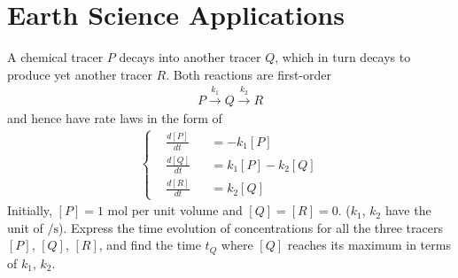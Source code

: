 \section{Earth Science Applications}

\begin{exmp}
A chemical tracer $P$ decays into another tracer $Q$, which in turn decays to produce yet another tracer $R$. Both reactions are first-order
\begin{align*}
P \xrightarrow{k_1} Q \xrightarrow{k_2} R
\end{align*}
and hence have rate laws in the form of
\begin{align*}
\left\{\begin{alignedat}{2}
&\frac{d[P]}{dt} & &= -k_1[P] \\
&\frac{d[Q]}{dt} & &= k_1[P] - k_2[Q] \\
&\frac{d[R]}{dt} & &= k_2[Q]
\end{alignedat}\right.
\end{align*}
Initially, $[P] = 1$ mol per unit volume and $[Q] = [R] = 0$. ($k_1$, $k_2$ have the unit of $\si{\per \s}$). Express the time evolution of concentrations for all the three tracers $[P]$, $[Q]$, $[R]$, and find the time $t_Q$ where $[Q]$ reaches its maximum in terms of $k_1$, $k_2$.
\end{exmp}
